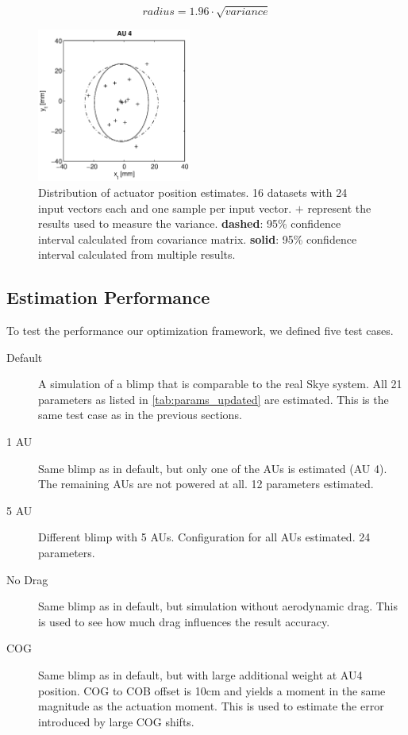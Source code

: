 \begin{equation}
\label{eq:variance_to_95pc}
radius = 1.96 \cdot \sqrt{variance}
\end{equation}

\begin{figure}[hbtp]
\centering
\includegraphics[width = 0.45\textwidth]{images/results/confidence_95_interval_AU4.eps}
\caption{Distribution of actuator position estimates. 16 datasets with 24 input vectors each and one sample per input vector.
$\mathbf{+}$ represent the results used to measure the variance.
\textbf{dashed}: 95\% confidence interval calculated from covariance matrix.
\textbf{solid}: 95\% confidence interval calculated from multiple results. }
\label{fig:result_95pc_confidence}
\end{figure}

\subsection{Estimation Performance}
\label{sub:est_perf}

To test the performance our optimization framework, we defined five test cases.
\begin{description}
\item[Default] A simulation of a blimp that is comparable to the real Skye system. All 21 parameters as listed in \cref{tab:params_updated} are estimated. This is the same test case as in the previous sections.
\item[1 AU] Same blimp as in default, but only one of the AUs is estimated (AU 4). The remaining AUs are not powered at all. 12 parameters estimated.
\item[5 AU] Different blimp with 5 AUs. Configuration for all AUs estimated. 24 parameters.
\item[No Drag] Same blimp as in default, but simulation without aerodynamic drag. This is used to see how much drag influences the result accuracy.
\item[COG] Same blimp as in default, but with large additional weight at AU4 position. COG to COB offset is 10cm and yields a moment in the same magnitude as the actuation moment. This is used to estimate the error introduced by large COG shifts.
\end{description}

